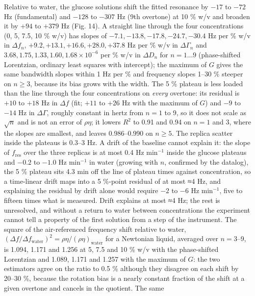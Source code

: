 \documentclass[11pt,a4paper]{article}
\begin{document}
Relative to water, the glucose solutions shift the fitted resonance by
\(-17\) to \(-72\) Hz (fundamental) and \(-128\) to \(-307\) Hz (9th
overtone) at 10 \% w/v and broaden it by \(+94\) to \(+379\) Hz (Fig.
14). A straight line through the four concentrations (0, 5, 7.5, 10 \%
w/v) has slopes of \(-7.1, -13.8, -17.8, -24.7, -30.4\) Hz per \% w/v in
\(\Delta f_n\), \(+9.2, +13.1, +16.6, +28.0, +37.8\) Hz per \% w/v in
\(\Delta\Gamma_n\) and \(3.68, 1.75, 1.33, 1.60, 1.68 \times 10^{-6}\)
per \% w/v in \(\Delta D_n\) for \(n = 1 \ldots 9\) (phase-shifted
Lorentzian, ordinary least squares with intercept); the maximum of \(G\)
gives the same bandwidth slopes within 1 Hz per \% and frequency slopes
1--30 \% steeper on \(n \ge 3\), because its bias grows with the width.
The 5 \% plateau is less loaded than the line through the four
concentrations on \emph{every} overtone: its residual is \(+10\) to
\(+18\) Hz in \(\Delta f\) (fit; \(+11\) to \(+26\) Hz with the maximum
of \(G\)) and \(-9\) to \(-14\) Hz in \(\Delta\Gamma\), roughly constant
in hertz from \(n = 1\) to 9, so it does not scale as \(\sqrt n\) and is
not an error of \(\rho\eta\); it lowers \(R^2\) to 0.91 and 0.94 on
\(n = 1\) and 3, where the slopes are smallest, and leaves 0.986--0.990
on \(n \ge 5\). The replica scatter inside the plateaus is 0.3--3 Hz. A
drift of the baseline cannot explain it: the slope of \(f_\mathrm{res}\)
over the three replicas is at most 0.4 Hz min\(^{-1}\) inside the
glucose plateaus and \(-0.2\) to \(-1.0\) Hz min\(^{-1}\) in water
(growing with \(n\), confirmed by the datalog), the 5 \% plateau sits
4.3 min off the line of plateau times against concentration, so a
time-linear drift maps into a 5 \%-point residual of at most ≈4 Hz, and
explaining the residual by drift alone would require \(-2\) to \(-6\) Hz
min\(^{-1}\), five to fifteen times what is measured. Drift explains at
most ≈4 Hz; the rest is unresolved, and without a return to water
between concentrations the experiment cannot tell a property of the
first solution from a step of the instrument. The square of the
air-referenced frequency shift relative to water,
\((\Delta f/\Delta f_\mathrm{water})^2 = \rho\eta/(\rho\eta)_\mathrm{water}\)
for a Newtonian liquid, averaged over \(n = 3\)--9, is 1.094, 1.171 and
1.256 at 5, 7.5 and 10 \% w/v with the phase-shifted Lorentzian and
1.089, 1.171 and 1.257 with the maximum of \(G\): the two estimators
agree on the ratio to 0.5 \% although they disagree on each shift by
20--30 \%, because the rotation bias is a nearly constant fraction of
the shift at a given overtone and cancels in the quotient. The same
\end{document}
